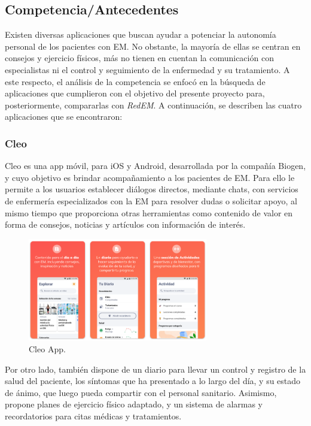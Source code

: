 \subsection{Competencia/Antecedentes}
Existen diversas aplicaciones que buscan ayudar a potenciar la autonomía personal de los pacientes con EM. No obstante, la mayoría de ellas se centran en consejos y ejercicio físicos, más no tienen en cuentan la comunicación con especialistas ni el control y seguimiento de la enfermedad y su tratamiento. A este respecto, el análisis de la competencia se enfocó en la búsqueda de aplicaciones que cumplieron con el objetivo del presente proyecto para, posteriormente, compararlas con \emph{RedEM}. A continuación, se describen las cuatro aplicaciones que se encontraron:

\subsubsection{Cleo}
Cleo es una app móvil, para iOS y Android, desarrollada por la compañía Biogen, y cuyo objetivo es brindar acompañamiento a los pacientes de EM. Para ello le permite a los usuarios establecer diálogos directos, mediante chats, con servicios de enfermería especializados con la EM para resolver dudas o solicitar apoyo, al mismo tiempo que proporciona otras herramientas como contenido de valor en forma de consejos, noticias y artículos con información de interés.

\begin{figure}[h]
    \centering
    \includegraphics[width=0.7\textwidth]{img/mercado/cleo.png}
    \caption{Cleo App.} \label{Img:Cleo+App}
\end{figure} 

Por otro lado, también dispone de un diario para llevar un control y registro de la salud del paciente, los síntomas que ha presentado a lo largo del día, y su estado de ánimo, que luego pueda compartir con el personal sanitario. Asimismo, propone planes de ejercicio físico adaptado, y un sistema de alarmas y recordatorios para citas médicas y tratamientos.


